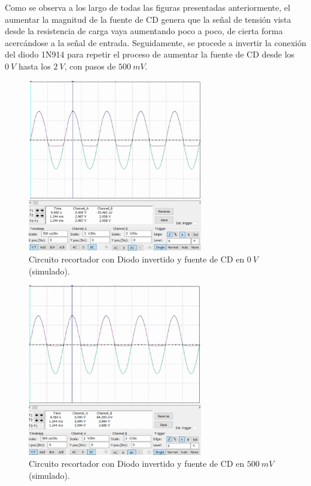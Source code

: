 \documentclass[journal]{IEEEtran}
\begin{document}
Como se observa a los largo de todas las figuras presentadas anteriormente, el aumentar la magnitud de la fuente de CD
genera que la señal de tensión vista desde la resistencia de carga vaya aumentando poco a poco, de cierta forma acercándose 
a la señal de entrada. Seguidamente, se procede a invertir la conexión del diodo 1N914 para repetir el proceso de aumentar 
la fuente de CD desde los $0~V$ hasta los $2~V$, con pasos de $500~mV$.
\begin{figure}[H]
        \centering
        \includegraphics[width=3in]{SignalSimulated_10.png}
        \caption{Circuito recortador con Diodo invertido y fuente de CD en $0~V$ (simulado).}
        \label{fig:SignalSimulated_10}
\end{figure}
\begin{figure}[H]
        \centering
        \includegraphics[width=3in]{SignalSimulated_11.png}
        \caption{Circuito recortador con Diodo invertido y fuente de CD en $500~mV$ (simulado).}
        \label{fig:SignalSimulated_11}
\end{figure}
\end{document}
